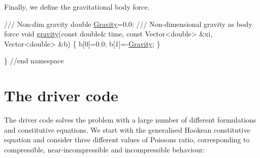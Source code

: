 Finally, we define the gravitational body force.


\begin{DoxyCodeInclude}
\textcolor{comment}{}
\textcolor{comment}{ /// Non-dim gravity}
\textcolor{comment}{} \textcolor{keywordtype}{double} \hyperlink{namespaceGlobal__Physical__Variables_a8b80d3e8d63b8d0a0ed435a2dd7fe2ad}{Gravity}=0.0;
\textcolor{comment}{}
\textcolor{comment}{ /// Non-dimensional gravity as body force}
\textcolor{comment}{} \textcolor{keywordtype}{void} \hyperlink{namespaceGlobal__Physical__Variables_a0777aef63372db7f91ad894c38159681}{gravity}(\textcolor{keyword}{const} \textcolor{keywordtype}{double}& time, 
              \textcolor{keyword}{const} Vector<double> &xi,
              Vector<double> &b)
 \{
  b[0]=0.0;
  b[1]=-\hyperlink{namespaceGlobal__Physical__Variables_a8b80d3e8d63b8d0a0ed435a2dd7fe2ad}{Gravity};
 \}
 
\} \textcolor{comment}{//end namespace}

\end{DoxyCodeInclude}




 

\hypertarget{index_main}{}\section{The driver code}\label{index_main}
The driver code solves the problem with a large number of different formulations and constitutive equations. We start with the generalised Hookean constitutive equation and consider three different values of Poisson\textquotesingle{}s ratio, corresponding to compressible, near-\/incompressible and incompressible behaviour\+:

